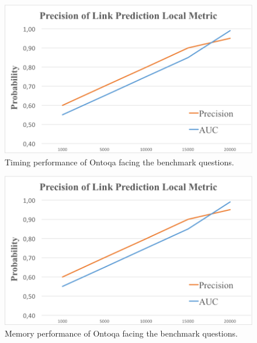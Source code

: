 \begin{figure}[tp]
	\centering
	\includegraphics{./fig/evaluation-time}
	\caption{Timing performance of Ontoqa facing the benchmark questions.}
	\label{fig:evaluation-time}
\end{figure}

\begin{figure}[tp]
	\centering
	\includegraphics{./fig/evaluation-memory}
	\caption{Memory performance of Ontoqa facing the benchmark questions.}
	\label{fig:evaluation-memory}
\end{figure}